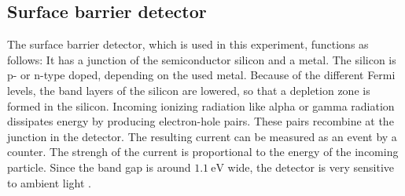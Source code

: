 \subsection{Surface barrier detector} \label{subsec:detector}
The surface barrier detector, which is used in this experiment, functions as follows: 
It has a junction of the semiconductor silicon and a metal. 
The silicon is p- or n-type doped, depending on the used metal.
Because of the different Fermi levels, the band layers of the silicon are lowered, so that a depletion zone is formed in the silicon.
Incoming ionizing radiation like alpha or gamma radiation dissipates energy by producing electron-hole pairs. 
These pairs recombine at the junction in the detector.
The resulting current can be measured as an event by a counter.
The strengh of the current is proportional to the energy of the incoming particle. %
Since the band gap is around $\qty{1.1}{\electronvolt}$ wide, the detector is very sensitive to ambient light \cite[215-234]{leo_1994}.


